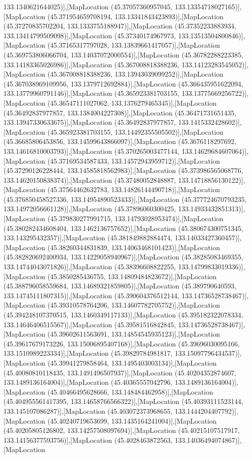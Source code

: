 133.1340621644025)],[MapLocation (45.37057360957045, 133.13354718027165)],[MapLocation (45.371954659708194, 133.13341843423893)],[MapLocation (45.37270835702204, 133.1333755188947)],[MapLocation (45.37352233883934, 133.13414799509098)],[MapLocation (45.37340174967973, 133.13513504800846)],[MapLocation (45.37165317797028, 133.13839661417057)],[MapLocation (45.369753806066704, 133.14037072000554)],[MapLocation (45.36782288223385, 133.14183365026986)],[MapLocation (45.367008818388236, 133.14123283545052)],[MapLocation (45.367008818388236, 133.13943039099252)],[MapLocation (45.367038969109956, 133.1379712692884)],[MapLocation (45.366435951622094, 133.13779960791146)],[MapLocation (45.365923381703155, 133.13775669256722)],[MapLocation (45.36547111027062, 133.1376279465345)],[MapLocation (45.36492837977857, 133.1384004227308)],[MapLocation (45.36471731651435, 133.13947330633675)],[MapLocation (45.36492837977857, 133.1415332428602)],[MapLocation (45.365923381703155, 133.14492355505502)],[MapLocation (45.36685806453856, 133.14599643866097)],[MapLocation (45.3676118297692, 133.14616810003793)],[MapLocation (45.370265003477144, 133.14629684607064)],[MapLocation (45.37169534587433, 133.14572943959712)],[MapLocation (45.37290126228444, 133.14585818562983)],[MapLocation (45.373986565068776, 133.14620150838374)],[MapLocation (45.37480052848887, 133.14718856130122)],[MapLocation (45.37564462632783, 133.14826144490718)],[MapLocation (45.376850458527336, 133.14954890523433)],[MapLocation (45.377724670793235, 133.14972056661128)],[MapLocation (45.37896060300425, 133.14933432851313)],[MapLocation (45.379830277991715, 133.14793028953474)],[MapLocation (45.380282434608404, 133.1462136757652)],[MapLocation (45.380674300751345, 133.143295432357)],[MapLocation (45.381849882884474, 133.14033427360457)],[MapLocation (45.38260344831839, 133.14063468101423)],[MapLocation (45.382820692400934, 133.14229058940967)],[MapLocation (45.38285083469355, 133.14744043071826)],[MapLocation (45.38396608822255, 133.14799833019336)],[MapLocation (45.3850285436755, 133.14809484823672)],[MapLocation (45.388796058559684, 133.14689321859805)],[MapLocation (45.389790640593, 133.14745111807315)],[MapLocation (45.390604376512144, 133.14736528738467)],[MapLocation (45.39310578764206, 133.14607782705752)],[MapLocation (45.394248107370515, 133.1460349117133)],[MapLocation (45.395182322078334, 133.14646406515567)],[MapLocation (45.39581516842845, 133.14736528738467)],[MapLocation (45.39602611563691, 133.14854545935123)],[MapLocation (45.39617679173226, 133.15006895407168)],[MapLocation (45.39696030095166, 133.1510989223334)],[MapLocation (45.39829784981817, 133.15097796434537)],[MapLocation (45.39941279858464, 133.1495403003134)],[MapLocation (45.40080810118435, 133.1491496507937)],[MapLocation (45.40204352874607, 133.1489136164004)],[MapLocation (45.40365557042796, 133.1489136164004)],[MapLocation (45.40466495628666, 133.148484462958)],[MapLocation (45.404955561417395, 133.14658766566322)],[MapLocation (45.40393111523144, 133.145107086287)],[MapLocation (45.403072373968655, 133.1444204407792)],[MapLocation (45.40240719653699, 133.1435164241004)],[MapLocation (45.40205805126802, 133.14257508097694)],[MapLocation (45.40215107517917, 133.14156377593756)],[MapLocation (45.4028463872563, 133.14036494074867)],[MapLocation 